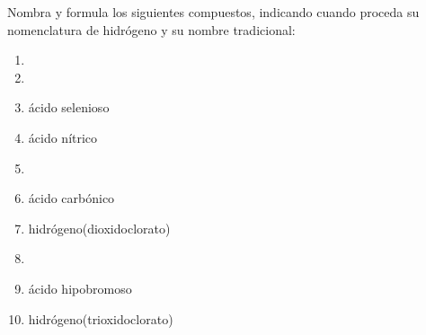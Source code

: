 \documentclass[10pt]{article}
\begin{document}
\begin{exercise}[
    tags    = {inorgánica,ácidos,ácidos binarios,ácidos ternarios},
    topics  = {química inorgánica,formulación,nomenclatura},
    source  = {SAN Formulación, p28, e36},
  ]

  Nombra y formula los siguientes compuestos, indicando cuando proceda su nomenclatura de hidrógeno y su nombre tradicional:

  \begin{enumerate}
    \item {}
    \item {}
    \item ácido selenioso
    \item ácido nítrico
    \item {}
    \item ácido carbónico
    \item hidrógeno(dioxidoclorato)
    \item {}
    \item ácido hipobromoso
    \item hidrógeno(trioxidoclorato)
  \end{enumerate}
\end{exercise}
\end{document}
